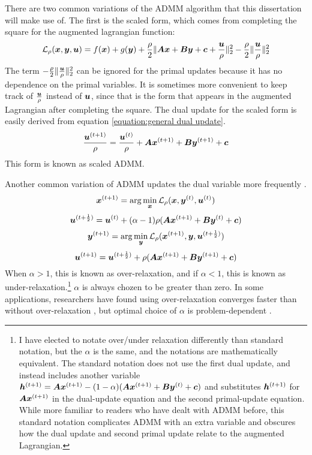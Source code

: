 There are two common variations of the ADMM algorithm that this dissertation will make use of.  The first is the scaled form, which comes from completing the square for the augmented lagrangian function:
%
\begin{equation}
\mathcal{L}_{\rho}(\bm{x},\bm{y},\bm{u}) = f(\bm{x}) + g(\bm{y}) + \frac{\rho}{2}\|\bm{A}\bm{x} + \bm{B}\bm{y} + \bm{c} + \frac{\bm{u}}{\rho}\|_2^2 - \frac{\rho}{2}\|\frac{\bm{u}}{\rho}\|_2^2
\end{equation}
%
The term $-\frac{\rho}{2}\|\frac{\bm{u}}{\rho}\|_2^2$ can be ignored for the primal updates because it has no dependence on the primal variables. It is sometimes more convenient to keep track of $\frac{\bm{u}}{\rho}$ instead of $\bm{u}$, since that is the form that appears in the augmented Lagrangian after completing the square. The dual update for the scaled form is easily derived from equation \ref{equation:general dual update}.
%
\begin{equation}
\frac{\bm{u}^{(t + 1)}}{\rho} = \frac{\bm{u}^{(t)}}{\rho} + \bm{A}\bm{x}^{(t + 1)} + \bm{B}\bm{y}^{(t + 1)} + \bm{c}
\end{equation}
%
This form is known as scaled ADMM.

Another common variation of ADMM updates the dual variable more frequently \cite{eckstein1994parallel}.
\begin{equation}
\bm{x}^{(t + 1)} = \arg\min_{\bm{x}} \mathcal{L}_{\rho}(\bm{x},\bm{y}^{(t)},\bm{u}^{(t)})
\end{equation}
%
\begin{equation}
\bm{u}^{(t + \frac{1}{2})} = \bm{u}^{(t)} + (\alpha - 1)\rho(\bm{A}\bm{x}^{(t + 1)} + \bm{B}\bm{y}^{(t)} + \bm{c})
\end{equation}
%
\begin{equation}
\bm{y}^{(t + 1)} = \arg\min_{\bm{y}} \mathcal{L}_{\rho}(\bm{x}^{(t + 1)},\bm{y},\bm{u}^{(t + \frac{1}{2})})
\end{equation}
%
\begin{equation}
\bm{u}^{(t + 1)} = \bm{u}^{(t + \frac{1}{2})} + \rho(\bm{A}\bm{x}^{(t + 1)} + \bm{B}\bm{y}^{(t + 1)} + \bm{c})
\end{equation}
%
When $\alpha > 1$, this is known as over-relaxation, and if $\alpha < 1$, this is known as under-relaxation.\footnote{I have elected to notate over/under relaxation differently than standard notation, but the $\alpha$ is the same, and the notations are mathematically equivalent. The standard notation does not use the first dual update, and instead includes another variable $\bm{h}^{(t + 1)} = \bm{A}\bm{x}^{(t + 1)} - (1 - \alpha)(\bm{A}\bm{x}^{(t + 1)} + \bm{B}\bm{y}^{(t)} + \bm{c})$ and substitutes $\bm{h}^{(t + 1)}$ for $\bm{A}\bm{x}^{(t + 1)}$ in the dual-update equation and the second primal-update equation. While more familiar to readers who have dealt with ADMM before, this standard notation complicates ADMM with an extra variable and obscures how the dual update and second primal update relate to the augmented Lagrangian.} $\alpha$ is always chozen to be greater than zero. In some applications, researchers have found using over-relaxation converges faster than without over-relaxation \cite{eckstein1994parallel}, but optimal choice of $\alpha$ is problem-dependent \cite{nishihara2015general}.


